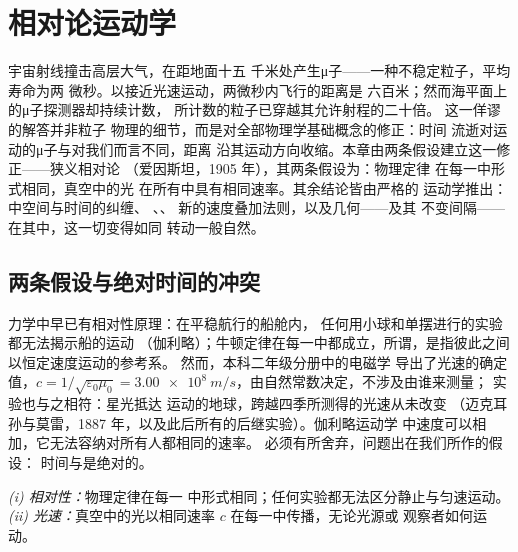 \chapter{相对论运动学}\label{ch:b3:relativistic-kinematics}

宇宙射线撞击高层大气，在距地面十五
千米处产生μ子——一种不稳定粒子，平均寿命为两
微秒。以接近光速运动，两微秒内飞行的距离是
六百米；然而海平面上的μ子探测器却持续计数，
所计数的粒子已穿越其允许射程的二十倍。
这一佯谬的解答并非粒子
物理的细节，而是对全部物理学基础概念的修正：时间
流逝对运动的μ子与对我们而言不同，距离
沿其运动方向收缩。本章由两条假设建立这一修正——狭义相对论
（爱因斯坦，1905 年），其两条假设为：物理定律
在每一中形式相同，真空中的光
在所有中具有相同速率。其余结论皆由严格的
运动学推出：中空间与时间的纠缠、
、、
新的速度叠加法则，以及几何——及其
不变间隔——在其中，这一切变得如同
转动一般自然。

\section{两条假设与绝对时间的冲突}

\begin{remark}[冲突从何而来]\label{rem:b3:relativistic-kinematics:conflict}
力学中早已有相对性原理：在平稳航行的船舱内，
任何用小球和单摆进行的实验都无法揭示船的运动
（伽利略）；牛顿定律在每一\emph{}中都成立，所谓，是指彼此之间以恒定速度运动的参考系。
然而，本科二年级分册中的电磁学
导出了光速的确定值，$c = 1/\sqrt{\varepsilon_0\mu_0} =
\qty{3.00e8}{m/s}$，由自然常数决定，不涉及由谁来测量；
实验也与之相符：星光抵达
运动的地球，跨越四季所测得的光速从未改变
（迈克耳孙与莫雷，1887 年，以及此后所有的后继实验）。伽利略运动学
中速度可以相加，它无法容纳对所有人都相同的速率。
必须有所舍弃，问题出在我们所作的假设：
时间与是绝对的。
\end{remark}

\begin{theorem}[狭义相对论的假设]\label{thm:b3:relativistic-kinematics:postulates}
\emph{(i) 相对性：}物理定律在每一
中形式相同；任何实验都无法区分静止与匀速运动。
\emph{(ii) 光速：}真空中的光以相同速率 $c$
在每一中传播，无论光源或
观察者如何运动。
\end{theorem}
\admitted


